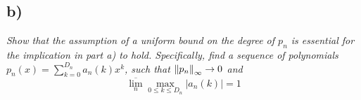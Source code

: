 \documentclass[12pt]{article}
\begin{document}
\subsection*{ b)}
{\it Show that the assumption of a uniform bound on the degree of $p_n$ is essential for the implication in part a) to hold.  Specifically, find a sequence of polynomials $p_n(x) = \sum_{k=0}^{D_n}a_n(k)x^k$, such that $\norm{p_n}_\infty \rightarrow 0$ and}
\begin{equation}
	\label{problem_7b_condition}
	\overline{\lim_n} \max_{0\leq k \leq D_n} |a_n(k)| = 1
\end{equation}
\end{document}
